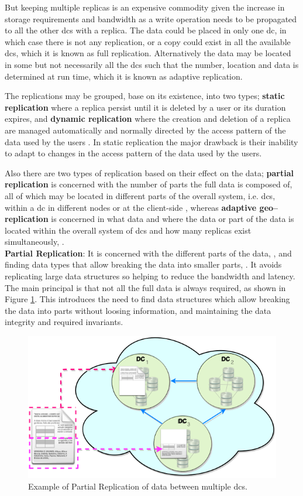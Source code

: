 \documentclass[12pt,twoside]{article}
\begin{document}
But keeping multiple replicas is an expensive commodity given the increase in storage requirements and bandwidth as a write operation needs to be propagated to all the other \glspl{dc} with a replica. The data could be placed in only one \gls{dc}, in which case there is not any replication, or a copy could exist in all the available \glspl{dc}, which it is known as full replication. Alternatively the data may be located in some but not necessarily all the \glspl{dc} such that the number, location and data is determined at run time, which it is known as adaptive replication.

The replications may be grouped, base on its existence, into two types; {\bf static replication} where a replica persist until it is deleted by a user or its duration expires, and {\bf dynamic replication} where the creation and deletion of a replica are managed automatically and normally directed by the access pattern of the data used by the users \cite{Dong2008a}. In static replication the major drawback is their inability to adapt to changes in the access pattern of the data used by the users.

Also there are two types of replication based on their effect on the data; {\bf partial replication} is concerned with the number of parts the full data is composed of, all of which may be located in different parts of the overall system, i.e. \glspl{dc}, within a \gls{dc} in different nodes or at the client-side \cite{Briquemont2015a, Briquemont2014a, Serrano2007a}, whereas {\bf adaptive geo--replication} is concerned in what data and where the data or part of the data is located within the overall system of \glspl{dc} and how many replicas exist simultaneously, \cite{Jeon2014a, KingsyGrace2013a, Wang2012a, Abad2011a, Abdul-Wahid2007a, Loukopoulos2004a}.\\


{\bf Partial Replication}: 
It is concerned with the different parts of the data, \cite{Briquemont2014a, Serrano2007a}, and finding data types that allow breaking the data into smaller parts, \cite{Briquemont2015a}. It avoids replicating large data structures so helping to reduce the bandwidth and latency. The main principal is that not all the full data is always required, as shown in Figure \ref{fig:partial_replication}. This introduces the need to find data structures which allow breaking the data into parts without loosing information, and maintaining the data integrity and required invariants.
\begin{figure}[ht!]
	\centering
	\includegraphics[width=.6\textwidth]{figures/partialReplication.png}

	\caption{Example of Partial Replication of data between multiple \glspl{dc}.}
	\label{fig:partial_replication}
\end{figure}
\end{document}
